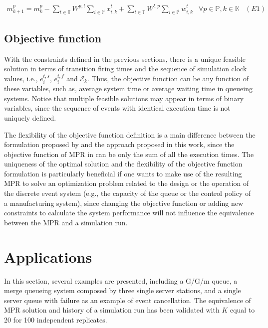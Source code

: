 \documentclass[suppldata]{interact}
\theoremstyle{plain}
\theoremstyle{definition}
\theoremstyle{remark}
\begin{document}
\begin{eqnarray}
	m^p_{k+1} = m^p_k - \sum_{t\in \mathbb{T}} W^{p,t} \sum_{i\in \mathbb{I}^{t}} x^t_{i,k} +  \sum_{t\in \mathbb{T}} W^{t,p} \sum_{i\in \mathbb{I}^{t}} w^t_{i,k} &\forall p\in \mathbb{P}, k\in \mathbb{K}& (E1) \nonumber
\end{eqnarray}

\subsection{Objective function}\label{sec:TPN_obj}
With the constraints defined in the previous sections, there is a unique feasible solution in terms of transition firing times and the %
sequence of simulation clock values, i.e., $e^{t,s}_i$, $e^{t,f}_{i}$ and $\mathcal{E}_k$. Thus, the objective function can be any function of %
these variables, %
such as, average %
system time or average waiting time in queueing systems. Notice that multiple feasible solutions may appear in terms of binary variables, since the sequence of events with identical execution time is not uniquely defined.

The flexibility of the objective function definition is a main difference between the formulation proposed by \cite{chan2008optimization} and the approach proposed in this work, since the objective function of MPR in \cite{chan2008optimization} can be only the sum of all the execution times. The uniqueness of the optimal solution and the flexibility of the objective function formulation is particularly beneficial if one wants to make use of the resulting MPR to solve an optimization problem %
related to the design or the operation of the discrete event system (e.g., %
the capacity of the queue or the control policy of a manufacturing system), since changing the objective function or adding new constraints to calculate the system performance will not influence the equivalence between the  MPR and a simulation run. %


\section{Applications}
In this section, several examples are presented, including a G/G/m queue, a merge queueing system composed by three single server stations, and a single server queue with failure as an example of event cancellation. The equivalence of MPR solution and history of a simulation run has been validated with $K$ equal to 20 for 100 independent replicates. 
\end{document}
